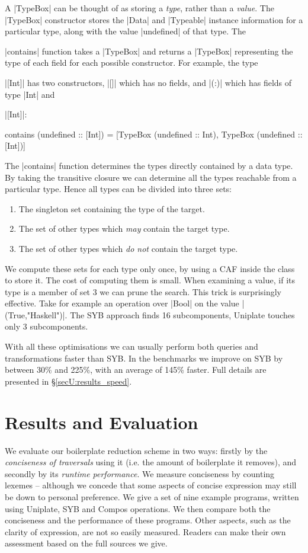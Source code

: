 A |TypeBox| can be thought of as storing a \textit{type}, rather than a \textit{value}. The |TypeBox| constructor stores the |Data| and |Typeable| instance information for a particular type, along with the value |undefined| of that type. The \ignore|contains| function takes a |TypeBox| and returns a |TypeBox| representing the type of each field for each possible constructor. For example, the type \ignore|[Int]| has two constructors, |[]| which has no fields, and |(:)| which has fields of type |Int| and \ignore|[Int]|:

\ignore\begin{code}
contains (undefined :: [Int]) =
    [TypeBox (undefined :: Int), TypeBox (undefined :: [Int])]
\end{code}

The |contains| function determines the types directly contained by a data type. By taking the transitive closure we can determine all the types reachable from a particular type. Hence all types can be divided into three sets:

\begin{enumerate}
\item The singleton set containing the type of the target.
\item The set of other types which \textit{may} contain the target type.
\item The set of other types which \textit{do not} contain the target type.
\end{enumerate}

We compute these sets for each type only once, by using a CAF inside the class to store it. The cost of computing them is small. When examining a value, if its type is a member of set 3 we can prune the search. This trick is surprisingly effective. Take for example an operation over |Bool| on the value |(True,"Haskell")|. The SYB approach finds 16 subcomponents, Uniplate touches only 3 subcomponents.

With all these optimisations we can usually perform both queries and transformations faster than SYB. In the benchmarks we improve on SYB by between 30\% and 225\%, with an average of 145\% faster. Full details are presented in \S\ref{secU:results_speed}.


\section{Results and Evaluation}
\label{secU:results}

We evaluate our boilerplate reduction scheme in two ways: firstly by the \textit{conciseness of traversals} using it (i.e. the amount of boilerplate it removes), and secondly by its \textit{runtime performance}. We measure conciseness by counting lexemes -- although we concede that some aspects of concise expression may still be down to personal preference. We give a set of nine example programs, written using Uniplate, SYB and Compos operations. We then compare both the conciseness and the performance of these programs. Other aspects, such as the clarity of expression, are not so easily measured. Readers can make their own assessment based on the full sources we give.

